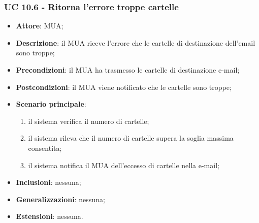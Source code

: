     \subsubsection{UC 10.6 - Ritorna l'errore troppe cartelle} \label{sec:UC10.6}
    \begin{itemize}
        \item \textbf{Attore}: MUA;
        \item \textbf{Descrizione}: il MUA riceve l'errore che le cartelle di destinazione dell'email sono troppe;
        \item \textbf{Precondizioni}: il MUA ha trasmesso le cartelle di destinazione e-mail;
        \item \textbf{Postcondizioni}: il MUA viene notificato che le cartelle sono troppe;
        \item \textbf{Scenario principale}:
            \begin{enumerate}
                \item il sistema verifica il numero di cartelle;
                \item il sistema rileva che il numero di cartelle supera la soglia massima consentita;
                \item il sistema notifica il MUA dell'eccesso di cartelle nella e-mail;
            \end{enumerate}
        \item \textbf{Inclusioni}: nessuna;
        \item \textbf{Generalizzazioni}: nessuna;
        \item \textbf{Estensioni}: nessuna.
    \end{itemize}
